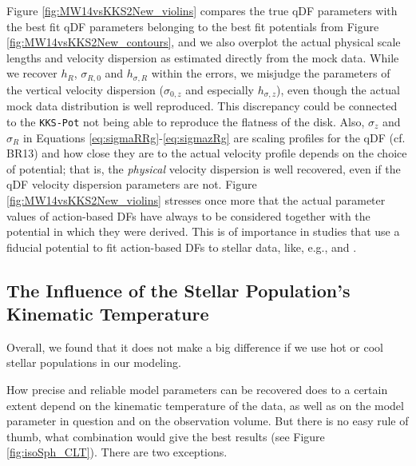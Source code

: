 \documentclass[iop,revtex4,numberedappendix,appendixfloats]{emulateapj}
\begin{document}
Figure \ref{fig:MW14vsKKS2New_violins} compares the true qDF parameters with the best fit qDF parameters belonging to the best fit potentials from Figure \ref{fig:MW14vsKKS2New_contours}, and we also overplot the actual physical scale lengths and velocity dispersion as estimated directly from the mock data. While we recover $h_R$, $\sigma_{R,0}$ and $h_{\sigma,R}$ within the errors, we misjudge the parameters of the vertical velocity dispersion ($\sigma_{0,z}$ and especially $h_{\sigma,z}$), even though the actual mock data distribution is well reproduced. This discrepancy could be connected to the \texttt{KKS-Pot} not being able to reproduce the flatness of the disk. Also, $\sigma_z$ and $\sigma_R$ in Equations \eqref{eq:sigmaRRg}-\eqref{eq:sigmazRg} are scaling profiles for the qDF (cf. BR13) and how close they are to the actual velocity profile depends on the choice of potential; that is, the \emph{physical} velocity dispersion is well recovered, even if the qDF velocity dispersion parameters are not. Figure \ref{fig:MW14vsKKS2New_violins} stresses once more that the actual parameter values of action-based DFs have always to be considered together with the potential in which they were derived. This is of importance in studies that use a fiducial potential to fit action-based DFs to stellar data, like, e.g., \citet{2015MNRAS.449.3479S} and \citet{2016MNRAS.tmp..817D}.

\subsection{The Influence of the Stellar Population's Kinematic Temperature} \label{sec:results_temperature}

Overall, we found that it does not make a big difference if we use hot or cool stellar populations in our modeling.

How precise and reliable model parameters can be recovered does to a certain extent depend on the kinematic temperature of the data, as well as on the model parameter in question and on the observation volume. But there is no easy rule of thumb, what combination would give the best results (see Figure \ref{fig:isoSph_CLT}). There are two exceptions.
\end{document}
